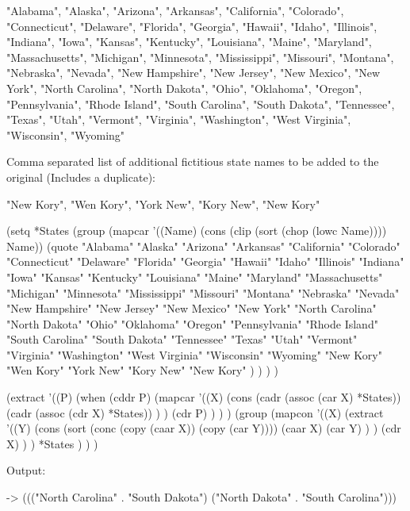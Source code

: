 \begin{wideverbatim}
    "Alabama", "Alaska", "Arizona", "Arkansas",
    "California", "Colorado", "Connecticut",
    "Delaware",    
    "Florida", "Georgia", "Hawaii",
    "Idaho", "Illinois", "Indiana", "Iowa",
    "Kansas", "Kentucky", "Louisiana",
    "Maine", "Maryland", "Massachusetts", "Michigan",
    "Minnesota", "Mississippi", "Missouri", "Montana",
    "Nebraska", "Nevada", "New Hampshire", "New Jersey",
    "New Mexico", "New York", "North Carolina", "North Dakota",
    "Ohio", "Oklahoma", "Oregon",
    "Pennsylvania", "Rhode Island",
    "South Carolina", "South Dakota", "Tennessee", "Texas",
    "Utah", "Vermont", "Virginia",
    "Washington", "West Virginia", "Wisconsin", "Wyoming"
\end{wideverbatim}

Comma separated list of additional fictitious state names to be added to
the original (Includes a duplicate):

\begin{wideverbatim}
"New Kory", "Wen Kory", "York New", "Kory New", "New Kory"
\end{wideverbatim}


\begin{wideverbatim}

(setq *States
   (group
      (mapcar '((Name) (cons (clip (sort (chop (lowc Name)))) Name))
         (quote
            "Alabama" "Alaska" "Arizona" "Arkansas"
            "California" "Colorado" "Connecticut"
            "Delaware"
            "Florida" "Georgia" "Hawaii"
            "Idaho" "Illinois" "Indiana" "Iowa"
            "Kansas" "Kentucky" "Louisiana"
            "Maine" "Maryland" "Massachusetts" "Michigan"
            "Minnesota" "Mississippi" "Missouri" "Montana"
            "Nebraska" "Nevada" "New Hampshire" "New Jersey"
            "New Mexico" "New York" "North Carolina" "North Dakota"
            "Ohio" "Oklahoma" "Oregon"
            "Pennsylvania" "Rhode Island"
            "South Carolina" "South Dakota" "Tennessee" "Texas"
            "Utah" "Vermont" "Virginia"
            "Washington" "West Virginia" "Wisconsin" "Wyoming"
            "New Kory" "Wen Kory" "York New" "Kory New" "New Kory" ) ) ) )

(extract
   '((P)
      (when (cddr P)
         (mapcar
            '((X)
               (cons
                  (cadr (assoc (car X) *States))
                  (cadr (assoc (cdr X) *States)) ) )
            (cdr P) ) ) )
   (group
      (mapcon
         '((X)
            (extract
               '((Y)
                  (cons
                     (sort (conc (copy (caar X)) (copy (car Y))))
                     (caar X)
                     (car Y) ) )
               (cdr X) ) )
         *States ) ) )

Output:

-> ((("North Carolina" . "South Dakota") ("North Dakota" . "South Carolina")))

\end{wideverbatim}

